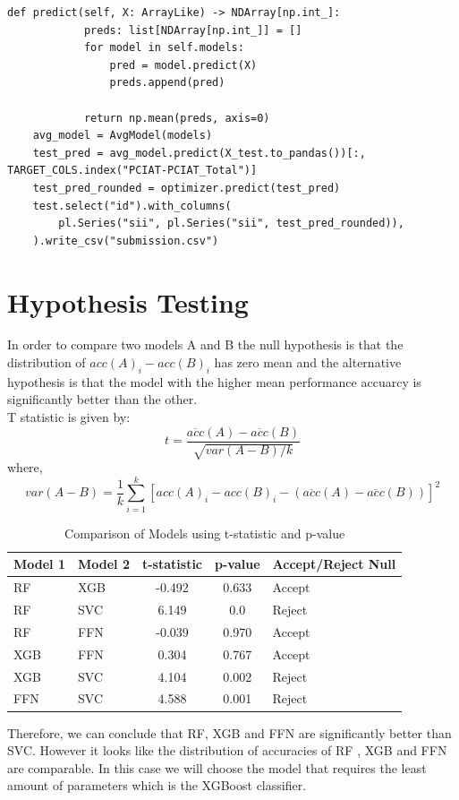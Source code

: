 \begin{appendices}
\begin{mdframed}
\begin{lstlisting}[breaklines=true]
        def predict(self, X: ArrayLike) -> NDArray[np.int_]:
            preds: list[NDArray[np.int_]] = []
            for model in self.models:
                pred = model.predict(X)
                preds.append(pred)

            return np.mean(preds, axis=0)
    avg_model = AvgModel(models)
    test_pred = avg_model.predict(X_test.to_pandas())[:, TARGET_COLS.index("PCIAT-PCIAT_Total")]
    test_pred_rounded = optimizer.predict(test_pred)
    test.select("id").with_columns(
        pl.Series("sii", pl.Series("sii", test_pred_rounded)),
    ).write_csv("submission.csv")
    \end{lstlisting}
    \end{mdframed}


    \pagebreak
    \section{Hypothesis Testing}
    In order to compare two models A and B the null hypothesis is that the distribution of $acc(A)_i - acc(B)_i$ has zero mean and the alternative hypothesis is that the model with the higher mean performance accuarcy is significantly better than the other.\\
    T statistic is given by:
        \[
        t = \frac{\overline{acc}(A) - \overline{acc}(B)}{\sqrt{var(A - B)/k}}
        \]
        where,
        \[
        var(A - B) = \frac{1}{k}\sum_{i=1}^k [acc(A)_i - acc(B)_i - (\overline{acc}(A) - \overline{acc}(B))]^2
        \]

        \begin{table}[h!]
            \centering
            \caption{Comparison of Models using t-statistic and p-value}
            \begin{tabular}{|l|l|c|c|l|}
                \hline
                \textbf{Model 1} & \textbf{Model 2} & \textbf{t-statistic} & \textbf{p-value} & \textbf{Accept/Reject Null} \\
                \hline
                RF & XGB & -0.492 & 0.633 & Accept \\
                \hline
                RF & SVC & 6.149 & 0.0 & Reject \\
                \hline
                RF & FFN & -0.039 & 0.970 & Accept \\
                \hline
                XGB & FFN & 0.304 & 0.767 & Accept \\
                \hline
                XGB & SVC & 4.104 & 0.002 & Reject \\
                \hline
                FFN & SVC & 4.588 & 0.001 & Reject \\
                \hline
            \end{tabular}
        \end{table}
    Therefore, we can conclude that RF, XGB and FFN are significantly better than SVC. 
    However it looks like the distribution of accuracies of RF , XGB and FFN are comparable. 
    In this case we will choose the model that requires the least amount of parameters which is the XGBoost classifier.


\end{appendices}
